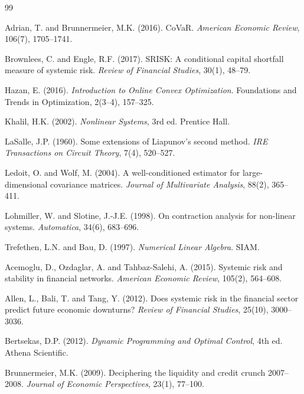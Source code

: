 \documentclass[11pt]{article}
\theoremstyle{definition}
\begin{document}

% 
\begin{thebibliography}{99}

Adrian, T. and Brunnermeier, M.K. (2016).
CoVaR.
\textit{American Economic Review}, 106(7), 1705--1741.

Brownlees, C. and Engle, R.F. (2017).
SRISK: A conditional capital shortfall measure of systemic risk.
\textit{Review of Financial Studies}, 30(1), 48--79.

Hazan, E. (2016).
\textit{Introduction to Online Convex Optimization}.
Foundations and Trends in Optimization, 2(3--4), 157--325.

Khalil, H.K. (2002).
\textit{Nonlinear Systems}, 3rd ed.
Prentice Hall.

LaSalle, J.P. (1960).
Some extensions of Liapunov's second method.
\textit{IRE Transactions on Circuit Theory}, 7(4), 520--527.

Ledoit, O. and Wolf, M. (2004).
A well-conditioned estimator for large-dimensional covariance matrices.
\textit{Journal of Multivariate Analysis}, 88(2), 365--411.

Lohmiller, W. and Slotine, J.-J.E. (1998).
On contraction analysis for non-linear systems.
\textit{Automatica}, 34(6), 683--696.

Trefethen, L.N. and Bau, D. (1997).
\textit{Numerical Linear Algebra}.
SIAM.

Acemoglu, D., Ozdaglar, A. and Tahbaz-Salehi, A. (2015).
Systemic risk and stability in financial networks.
\textit{American Economic Review}, 105(2), 564--608.

Allen, L., Bali, T. and Tang, Y. (2012).
Does systemic risk in the financial sector predict future economic downturns?
\textit{Review of Financial Studies}, 25(10), 3000--3036.

Bertsekas, D.P. (2012).
\textit{Dynamic Programming and Optimal Control}, 4th ed.
Athena Scientific.

Brunnermeier, M.K. (2009).
Deciphering the liquidity and credit crunch 2007--2008.
\textit{Journal of Economic Perspectives}, 23(1), 77--100.


\end{thebibliography}
\end{document}
